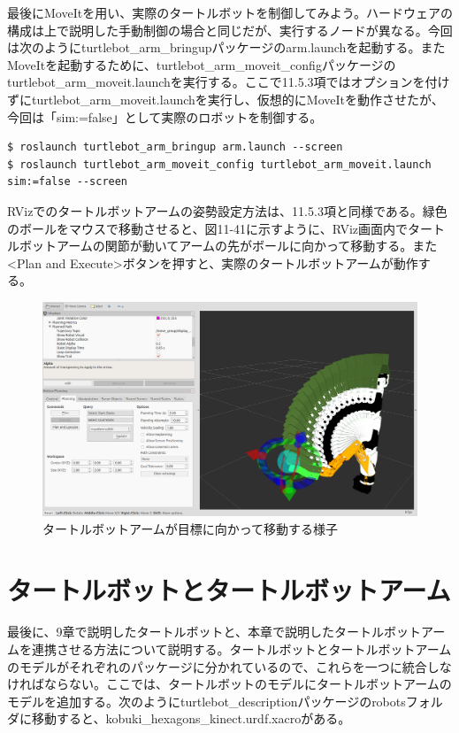 最後にMoveItを用い、実際のタートルボットを制御してみよう。ハードウェアの構成は上で説明した手動制御の場合と同じだが、実行するノードが異なる。今回は次のようにturtlebot\_arm\_bringupパッケージのarm.launchを起動する。またMoveItを起動するために、turtlebot\_arm\_moveit\_configパッケージのturtlebot\_arm\_moveit.launchを実行する。ここで11.5.3項ではオプションを付けずにturtlebot\_arm\_moveit.launchを実行し、仮想的にMoveItを動作させたが、今回は「sim:=false」として実際のロボットを制御する。

\begin{lstlisting}[language=ROS]
$ roslaunch turtlebot_arm_bringup arm.launch --screen
$ roslaunch turtlebot_arm_moveit_config turtlebot_arm_moveit.launch sim:=false --screen
\end{lstlisting}

RVizでのタートルボットアームの姿勢設定方法は、11.5.3項と同様である。緑色のボールをマウスで移動させると、図11-41に示すように、RViz画面内でタートルボットアームの関節が動いてアームの先がボールに向かって移動する。また<Plan and Execute>ボタンを押すと、実際のタートルボットアームが動作する。

\begin{figure}[htp]
  \centering
  \includegraphics[width=12cm]{pictures/chapter11/pic_11_41.png}
  \caption{タートルボットアームが目標に向かって移動する様子}
\end{figure}

\section{タートルボットとタートルボットアーム}

最後に、9章で説明したタートルボットと、本章で説明したタートルボットアームを連携させる方法について説明する。タートルボットとタートルボットアームのモデルがそれぞれのパッケージに分かれているので、これらを一つに統合しなければならない。ここでは、タートルボットのモデルにタートルボットアームのモデルを追加する。次のようにturtlebot\_descriptionパッケージのrobotsフォルダに移動すると、kobuki\_hexagons\_kinect.urdf.xacroがある。

